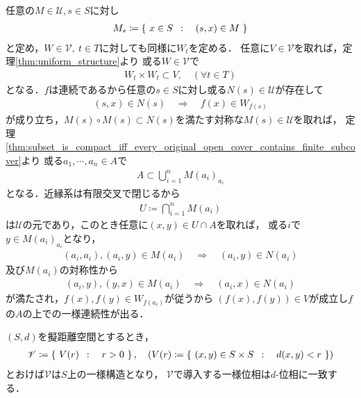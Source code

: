 	\begin{prf}
		任意の$M \in \mathscr{U}, s \in S$に対し
		\begin{align}
			M_s \coloneqq \left\{\ x \in S\ \, : \quad (s,x) \in M\ \right\}
		\end{align}
		と定め，$W \in \mathscr{V},\ t \in T$に対しても同様に$W_t$を定める．
		任意に$V \in \mathscr{V}$を取れば，定理\ref{thm:uniform_structure}より
		或る$W \in \mathscr{V}$で
		\begin{align}
			W_t \times W_t \subset V,
			\quad (\forall t \in T)
		\end{align}
		となる．$f$は連続であるから任意の$s \in S$に対し或る$N(s) \in \mathscr{U}$が存在して
		\begin{align}
			(s,x) \in N(s) \quad \Longrightarrow \quad
			f(x) \in W_{f(s)}
		\end{align}
		が成り立ち，$M(s) \circ M(s) \subset N(s)$を満たす対称な$M(s) \in \mathscr{U}$を取れば，
		定理\ref{thm:subset_is_compact_iff_every_original_open_cover_contains_finite_subcover}より
		或る$a_1,\cdots,a_n \in A$で
		\begin{align}
			A \subset \bigcup_{i=1}^n M(a_i)_{a_i}
		\end{align}
		となる．近縁系は有限交叉で閉じるから
		\begin{align}
			U \coloneqq \bigcap_{i=1}^n M(a_i)
		\end{align}
		は$\mathscr{U}$の元であり，このとき任意に$(x,y) \in U \cap A$を取れば，
		或る$i$で$y \in M(a_i)_{a_i}$となり，
		\begin{align}
			(a_i,a_i),(a_i,y) \in M(a_i) \quad \Longrightarrow \quad
			(a_i,y) \in N(a_i)
		\end{align}
		及び$M(a_i)$の対称性から
		\begin{align}
			(a_i,y),(y,x) \in M(a_i) \quad \Longrightarrow \quad
			(a_i,x) \in N(a_i)
		\end{align}
		が満たされ，$f(x),f(y) \in W_{f(a_i)}$が従うから
		$(f(x),f(y)) \in V$が成立し$f$の$A$の上での一様連続性が出る．
		\QED
	\end{prf}
	
	\begin{screen}
		\begin{thm}[擬距離空間の一様構造]
		\label{thm:uniform_structure_on_pseudometric_spaces}
			$(S,d)$を擬距離空間とするとき，
			\begin{align}
				\mathscr{V} \coloneqq
				\left\{\ V(r)\ \, : \quad r > 0\ \right\},
				\quad (V(r) \coloneqq \left\{\ (x,y) \in S \times S\ \, : \quad d(x,y) < r\ \right\})
			\end{align}
			とおけば$\mathscr{V}$は$S$上の一様構造となり，
			$\mathscr{V}$で導入する一様位相は$d$-位相に一致する．
		\end{thm}
	\end{screen}
	
